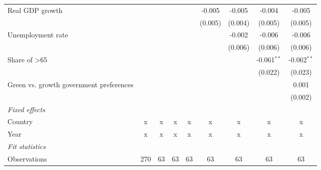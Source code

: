 \begin{table}[htbp]
\begin{tabular}{lcccccccc}
      Real GDP growth                                                        &         &         &                &                & -0.005         & -0.005         & -0.004         & -0.005\\   
                                                                             &         &         &                &                & (0.005)        & (0.004)        & (0.005)        & (0.005)\\   
      Unemployment rate                                                      &         &         &                &                &                & -0.002         & -0.006         & -0.006\\   
                                                                             &         &         &                &                &                & (0.006)        & (0.006)        & (0.006)\\   
      Share of >65                                                           &         &         &                &                &                &                & -0.061$^{**}$  & -0.062$^{**}$\\   
                                                                             &         &         &                &                &                &                & (0.022)        & (0.023)\\   
      Green vs. growth government preferences                                &         &         &                &                &                &                &                & 0.001\\   
                                                                             &         &         &                &                &                &                &                & (0.002)\\   
      \emph{Fixed effects}\\
      Country                                                                & x       & x       & x              & x              & x              & x              & x              & x\\  
      Year                                                                   & x       & x       & x              & x              & x              & x              & x              & x\\  
      \midrule \emph{Fit statistics}\\
      Observations                                                           & 270     & 63      & 63             & 63             & 63             & 63             & 63             & 63\\  

\end{tabular}
\end{table}

